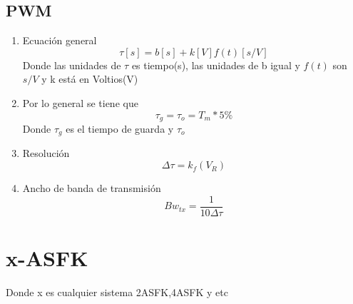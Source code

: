 \documentclass[10pt]{article}
\begin{document}
\subsection{PWM}
	\begin{enumerate}
		\item Ecuación general
		\begin{equation}
			\tau[s]=b[s]+k[V]f(t)[s/V]
		\end{equation}
		Donde las unidades de $\tau$ es tiempo(s), las unidades de b igual y $f(t)$ son $s/V$ y k está en Voltios(V)
		\item Por lo general se tiene que
		\begin{equation}
			\tau_g=\tau_o=T_m*5\%
		\end{equation}
		Donde $\tau_g$ es el tiempo de guarda y $\tau_o$
		\item Resolución
		\begin{equation}
		\Delta\tau=k_f(V_R)
		\end{equation}
		\item Ancho de banda de transmisión
		\begin{equation}
			Bw_{tx}=\frac{1}{10\Delta\tau}
		\end{equation}
	\end{enumerate}
	\section{x-ASFK}
	Donde x es cualquier sistema 2ASFK,4ASFK y etc
	
\end{document}
